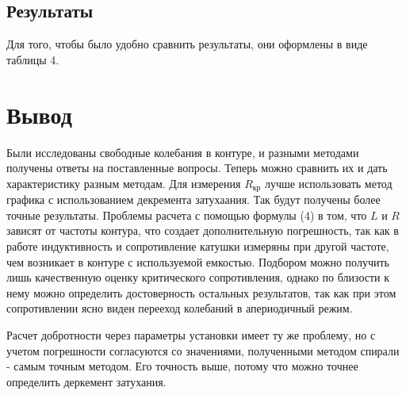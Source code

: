 \documentclass[a4paper, 14pt]{extarticle}%
\begin{document}
\subsection*{Результаты}

Для того, чтобы было удобно сравнить результаты, они оформлены в виде таблицы 4.



\section*{Вывод}

Были исследованы свободные колебания в контуре, и разными методами получены ответы на поставленные вопросы. Теперь можно сравнить их и дать характеристику разным методам. Для измерения $R_{\text{кр}}$ лучше использовать метод графика с использованием декремента затухаания. Так будут получены более точные результаты. Проблемы расчета с помощью формулы (4) в том, что $L$ и $R$ зависят от частоты контура, что создает дополнительную погрешность, так как в работе индуктивность и сопротивление катушки измеряны при другой частоте, чем возникает в контуре с используемой емкостью. Подбором можно получить лишь качественную оценку критического сопротивления, однако по близости к нему можно определить достоверность остальных результатов, так как при этом сопротивлении ясно виден перееход колебаний в апериодичный режим. 

Расчет добротности через параметры установки имеет ту же проблему, но с учетом погрешности согласуются со значениями, полученными методом спирали - самым точным методом. Его точность выше, потому что можно точнее определить деркемент затухания.
\end{document}
